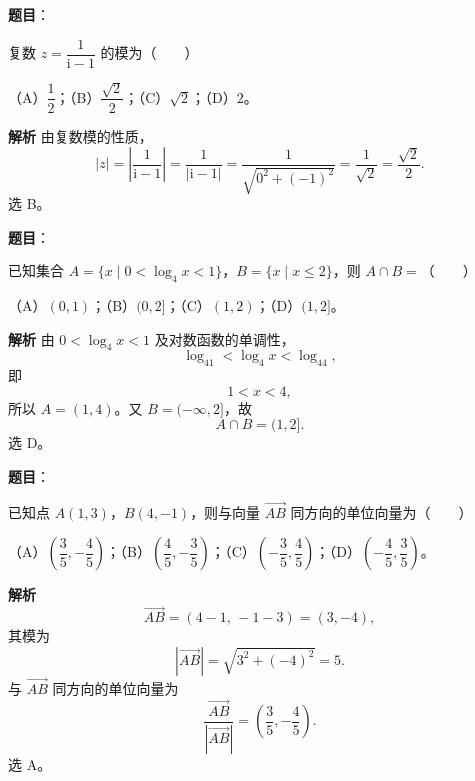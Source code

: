 

\begin{answer}

\textbf{题目}：

复数 $z=\dfrac{1}{\mathrm i-1}$ 的模为\mbox{（　　）}

（A）$\dfrac12$；（B）$\dfrac{\sqrt2}2$；（C）$\sqrt2$；（D）$2$。

\textbf{解析}
由复数模的性质，
\nopagebreak[4]
\[|z|=\left|\frac1{\mathrm i-1}\right|=\frac1{|\mathrm i-1|}=\frac1{\sqrt{0^2+(-1)^2}}=\frac1{\sqrt2}=\frac{\sqrt2}2.\]
选 B。


\end{answer}
\begin{answer}

\textbf{题目}：

已知集合 $A=\{x\mid 0<\log_4x<1\}$，$B=\{x\mid x\leqslant2\}$，则 $A\cap B=$\mbox{（　　）}

（A）$(0,1)$；（B）$(0,2]$；（C）$(1,2)$；（D）$(1,2]$。

\textbf{解析}
由 $0<\log_4x<1$ 及对数函数的单调性，
\nopagebreak[4]
\[\log_41<\log_4x<\log_44,\]
即
\nopagebreak[4]
\[1<x<4,\]
所以 $A=(1,4)$。又 $B=(-\infty,2]$，故
\nopagebreak[4]
\[A\cap B=(1,2].\]
选 D。

\gkanswer{答案：D。$0<\log_4x<1$ 给出 $1<x<4$，与 $x\leqslant2$ 取交集得 $(1,2]$。}

\end{answer}
\begin{answer}

\textbf{题目}：

已知点 $A(1,3)$，$B(4,-1)$，则与向量 $\overrightarrow{AB}$ 同方向的单位向量为\mbox{（　　）}

（A）$\left(\dfrac35,-\dfrac45\right)$；（B）$\left(\dfrac45,-\dfrac35\right)$；（C）$\left(-\dfrac35,\dfrac45\right)$；（D）$\left(-\dfrac45,\dfrac35\right)$。

\textbf{解析}
\nopagebreak[4]
\[\overrightarrow{AB}=(4-1,\,-1-3)=(3,-4),\]
其模为
\nopagebreak[4]
\[|\overrightarrow{AB}|=\sqrt{3^2+(-4)^2}=5.\]
与 $\overrightarrow{AB}$ 同方向的单位向量为
\nopagebreak[4]
\[\frac{\overrightarrow{AB}}{|\overrightarrow{AB}|}=\left(\frac35,-\frac45\right).\]
选 A。


\end{answer}
